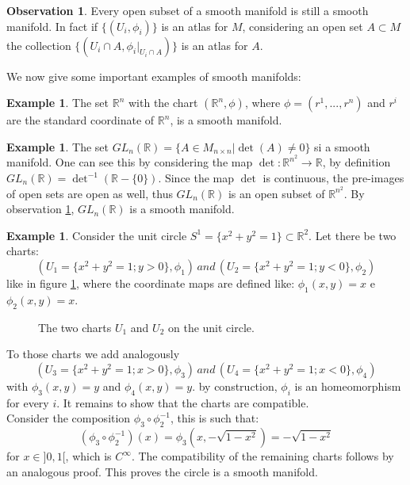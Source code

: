 \documentclass[12pt,a4paper]{report}
\theoremstyle{definition}
\theoremstyle{Theorem}
\theoremstyle{definition}
\newtheorem{Ex}[Def]{Example}
\theoremstyle{definition}
\newtheorem{Obs}[Def]{Observation}
\begin{document}
		\begin{Obs}\label{Obs:1.1.1}
			Every open subset of a smooth manifold is still a smooth manifold. In fact if $\{(U_i,\phi_i)\}$ is an atlas for $M$, considering an open set $A\subset M$ the collection $\{(U_i\cap A,\phi_i|_{U_i\cap A})\}$ is an atlas for $A$.
		\end{Obs}
		We now give some important examples of smooth manifolds:
		\begin{Ex}
			The set $\mathbb{R}^n$ with the chart $(\mathbb{R}^n,\phi)$, where $\phi=(r^1,...,r^n)$ and $r^i$ are the standard coordinate of $\mathbb{R}^n$, is a smooth manifold.
		\end{Ex}
		\begin{Ex}\label{Ex 1.1}
			The set $GL_n(\mathbb{R})=\{A\in M_{n\times n}|\det(A)\neq0\}$ si a smooth manifold. One can see this by considering the map $\det:\mathbb{R}^{n^2}\rightarrow \mathbb{R}$, by definition $GL_n(\mathbb{R})=\det^{-1}(\mathbb{R}-\{0\})$. Since the map $\det$ is continuous, the pre-images of open sets are open as well, thus $GL_n(\mathbb{R})$ is an open subset of $\mathbb{R}^{n^2}$. By observation \ref{Obs:1.1.1}, $GL_n(\mathbb{R})$ is a smooth manifold.
		\end{Ex}
		\begin{Ex}
			Consider the unit circle $S^1=\{x^2+y^2=1\}\subset \mathbb{R}^2$. Let there be two charts: $$(U_1=\{x^2+y^2=1;y>0\},\phi_1) \, and \,  (U_2=\{x^2+y^2=1;y<0\},\phi_2)$$ like in figure \ref{figura 1}, where the coordinate maps are defined like: $\phi_1(x,y)=x$ e $\phi_2(x,y)=x$.
			\begin{figure}[H]
				\centering
				\label{figura 1}
				\caption{The two charts $U_1$ and $U_2$ on the unit circle.}
			\end{figure}
			To those charts we add analogously $$(U_3=\{x^2+y^2=1;x>0\},\phi_3)\, and \, (U_4=\{x^2+y^2=1;x<0\},\phi_4)$$ with $\phi_3(x,y)=y$ and $\phi_4(x,y)=y$. by construction, $\phi_i$ is an homeomorphism for every $i$. It remains to show that the charts are compatible.\\
			Consider the composition $\phi_3\circ\phi_2^{-1}$, this is such that: $$(\phi_3\circ\phi_2^{-1})(x)=\phi_3(x,-\sqrt{1-x^2})=-\sqrt{1-x^2}$$ for $x\in ]0,1[$, which is $C^\infty$. The compatibility of the remaining charts follows by an analogous proof. This proves the circle is a smooth manifold.
		\end{Ex}
\end{document}
